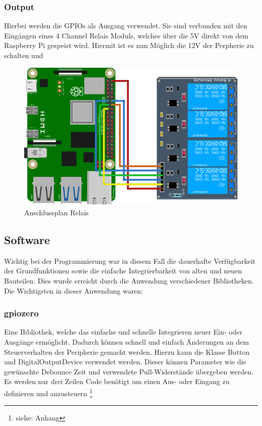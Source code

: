 \subsubsection{Output}
Hierbei werden die GPIOs als Ausgang verwendet. Sie sind verbunden mit den Eingängen eines 4 Channel Relais Moduls, welches über die 5V direkt von dem Raspberry Pi gespeist wird. Hiermit ist es nun Möglich die 12V der Perpherie zu schalten und 
\begin{figure}[H]
	\begin{center}
		\includegraphics[scale=0.7]{figures/hcis/4ch_relai.png}
			\caption{Anschlussplan Relais}
			\label{fig:output}
	\end{center}
\end{figure}

\subsection{Software}

Wichtig bei der Programmierung war in diesem Fall die dauerhafte Verfügbarkeit der Grundfunktionen  sowie die einfache Integrierbarkeit von alten und neuen Bauteilen. Dies wurde erreicht durch die Anwendung verschiedener Bibliotheken.\\
Die Wichtigsten in dieser Anwendung waren: \\

\subsubsection{gpiozero}

Eine Bibliothek, welche das einfache und schnelle Integrieren neuer Ein- oder Ausgänge ermöglicht. Dadurch können schnell und einfach Änderungen an dem Steuerverhalten der Peripherie gemacht werden. Hierzu kann die Klasse Button und DigitalOutputDevice verwendet werden. Dieser können Parameter wie die gewünschte Debounce Zeit und verwendete Pull-Widerstände übergeben werden. Es werden nur drei Zeilen Code benötigt um einen Aus- oder Eingang zu definieren und anzusteuern \footnote{siehe: Anhang}

